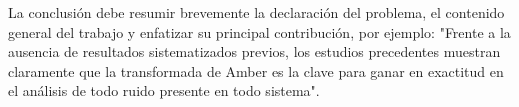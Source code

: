 La conclusión debe resumir brevemente la declaración del problema, el contenido general del trabajo y enfatizar su principal contribución, por ejemplo:
"Frente a la ausencia de resultados sistematizados previos, los estudios precedentes muestran claramente que la transformada de Amber es la clave para ganar en exactitud en el análisis de todo ruido presente en todo sistema".